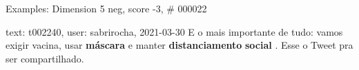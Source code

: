 \begin{frame}{Examples: Dimension 5 neg, score -3, \# 000022}
\footnotesize
\begin{alertblock}{text: t002240, user: sabrirocha, 2021-03-30}
E o mais importante de tudo: vamos exigir vacina, usar \textbf{máscara} e 
manter \textbf{distanciamento} \textbf{social} . Esse o Tweet pra ser 
compartilhado.  
\end{alertblock}
\end{frame}
